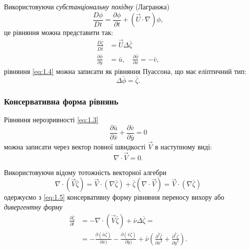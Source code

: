 Використовуючи \textit{субстанціональну похідну} (Лагранжа)
\begin{equation}
    \dfrac{D \phi}{D t} = \dfrac{\partial \phi}{\partial t} + (\vec U \cdot \nabla) \phi,
\end{equation}
це рівняння можна представити так:
\begin{align}
    \label{eq:1.6}
    \frac{D \bar \zeta}{D \bar t} &= \vec U \Delta \bar \zeta \\
    \label{eq:1.7}
    \frac{\partial \bar \phi}{\partial \bar y} &= \bar u, \quad \frac{\partial \bar \phi}{\partial \bar x} = - \bar v,
\end{align}
рівняння \ref{eq:1.4} можна записати як рівняння Пуассона, що має еліптичний тип:
\begin{equation}
    \label{eq:1.8}
    \Delta \bar \phi = \bar \zeta.
\end{equation}

\subsubsection{Консервативна форма рівнянь}

Рівняння нерозривності \ref{eq:1.3}
\begin{equation}
    \frac{\partial \bar u}{\partial \bar x} + \frac{\partial \bar v}{\partial \bar y} = 0
\end{equation}
можна записати через вектор повної швидкості $\vec V$ в наступному виді:
\begin{equation}
    \label{eq:1.9}
    \nabla \cdot \vec V = 0.
\end{equation}

Використовуючи відому тотожність векторної алгебри
\begin{equation}
    \nabla  \cdot (\vec V \bar \zeta) = \vec V \cdot (\nabla \bar \zeta) + \bar \zeta (\nabla \cdot \vec V) = \vec V \cdot (\nabla \bar \zeta)
\end{equation}
одержуємо з \ref{eq:1.5} консервативну форму рівняння переносу вихору або \textit{дивергентну форму}
\begin{equation}
    \label{eq:1.10}
    \begin{aligned}
        \frac{\partial \bar \zeta}{\partial \bar t} &= - \nabla \cdot (\vec V \bar \zeta) + \bar \nu \Delta \bar \zeta = \\
        &= - \frac{\partial (\bar u \bar \zeta)}{\partial \bar x)} - \frac{\partial (\bar v \bar \zeta)}{\partial \bar y)} + \bar \nu \left( \frac{\partial^2 \bar \zeta}{\partial \bar x^2} + \frac{\partial^2 \bar \zeta}{\partial \bar y^2} \right).
    \end{aligned}
\end{equation}

